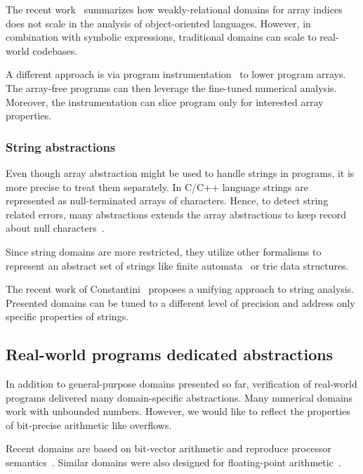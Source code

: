 The recent work~\cite{Payet2018} summarizes how weakly-relational domains for
array indices does not scale in the analysis of object-oriented languages.
However, in combination with symbolic expressions, traditional domains can
scale to real-world codebases.

A different approach is via program instrumentation~\cite{Cornish2015} to lower
program arrays. The array-free programs can then leverage the fine-tuned
numerical analysis. Moreover, the instrumentation can slice program only for
interested array properties.


\subsubsection{String abstractions}

Even though array abstraction might be used to handle strings in programs, it
is more precise to treat them separately. In C/C++ language strings are
represented as null-terminated arrays of characters. Hence, to detect string
related errors, many abstractions extends the array abstractions to keep record
about null characters~\cite{Olliaro2018}.

Since string domains are more restricted, they utilize other formalisms to
represent an abstract set of strings like finite
automata~\cite{Christensen2003} or trie data structures.

The recent work of Constantini~\cite{Costantini2011, Costantini2015} proposes a
unifying approach to string analysis.  Presented domains can be tuned to a
different level of precision and address only specific properties of strings.


\subsection{Real-world programs dedicated abstractions}

In addition to general-purpose domains presented so far, verification of
real-world programs delivered many domain-specific abstractions. Many numerical
domains work with unbounded numbers. However, we would like to reflect the
properties of bit-precise arithmetic like overflows.

Recent domains are based on bit-vector arithmetic and reproduce processor semantics~\cite{Sharma2013, Sharma2017}. Similar domains were also designed for floating-point arithmetic~\cite{Putot2004}.

